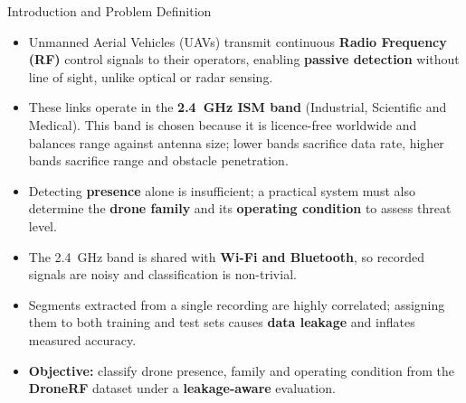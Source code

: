 \documentclass[aspectratio=169,11pt]{beamer}
\begin{document}
\begin{frame}{Introduction and Problem Definition}
\begin{itemize}
\item Unmanned Aerial Vehicles (UAVs) transmit continuous \textbf{Radio
Frequency (RF)} control signals to their operators, enabling \textbf{passive
detection} without line of sight, unlike optical or radar sensing.
\item These links operate in the \textbf{2.4~GHz ISM band} (Industrial,
Scientific and Medical). This band is chosen because it is licence-free
worldwide and balances range against antenna size; lower bands sacrifice data
rate, higher bands sacrifice range and obstacle penetration.
\item Detecting \textbf{presence} alone is insufficient; a practical system must
also determine the \textbf{drone family} and its \textbf{operating condition}
to assess threat level.
\item The 2.4~GHz band is shared with \textbf{Wi-Fi and Bluetooth}, so recorded
signals are noisy and classification is non-trivial.
\item Segments extracted from a single recording are highly correlated;
assigning them to both training and test sets causes \textbf{data leakage} and
inflates measured accuracy.
\item \textbf{Objective:} classify drone presence, family and operating
condition from the \textbf{DroneRF} dataset under a \textbf{leakage-aware}
evaluation.
\end{itemize}
\end{frame}
\end{document}
